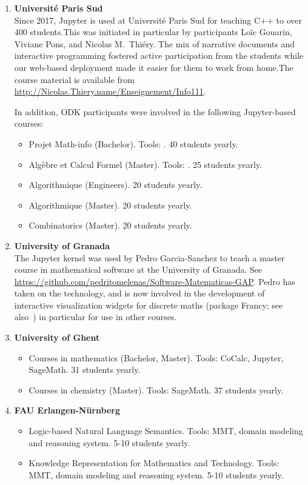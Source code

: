 \begin{enumerate}
\item \textbf{Université Paris Sud}\\
  Since 2017, Jupyter is used at Université Paris Sud for teaching C++
  to over 400 students.This was initiated in particular by \ODK
  participants Loïc Gouarin, Viviane Pons, and Nicolas M.\ Thiéry. The
  mix of narrative documents and interactive programming fostered
  active participation from the students while our web-based
  deployment made it easier for them to work from home.The course
  material is available from
  \url{http://Nicolas.Thiery.name/Enseignement/Info111}.

  In addition, ODK participants were involved in the following
  Jupyter-based courses:
  \begin{itemize}
  \item Projet Math-info (Bachelor). Tools: \Sage. 40 students yearly.
  \item Algèbre et Calcul Formel (Master). Tools: \Sage. 25 students yearly.
  \item Algorithmique (Engineers). 20 students yearly.
  \item Algorithmique (Master). 20 students yearly.
  \item Combinatorics (Master). 20 students yearly.
  \end{itemize}

\item \textbf{University of Granada}\\
  The \GAP Jupyter kernel was used by Pedro Garcia-Sanchez to teach a
  master course in mathematical software at the University of Granada.
  See
  \url{https://github.com/pedritomelenas/Software-Matematicas-GAP}.
  Pedro has taken on the technology, and is now involved in the
  development of interactive visualization widgets for discrete maths
  (package Francy; see
  also~) in particular
  for use in other courses.

\item \textbf{University of Ghent}
  \begin{itemize}
  \item Courses in mathematics (Bachelor, Master). Tools: CoCalc,
    Jupyter, SageMath. 31 students yearly.
  \item Courses in chemistry (Master). Tools: SageMath. 37 students
    yearly.
  \end{itemize}

\item \textbf{FAU Erlangen-Nürnberg}
  \begin{itemize}
  \item Logic-based Natural Language Semantics. Tools: MMT, domain
    modeling and reasoning system. 5-10 students yearly.
  \item Knowledge Representation for Mathematics and Technology.
    Tools: MMT, domain modeling and reasoning system.
    5-10 students yearly.
 \end{itemize}


\end{enumerate}
